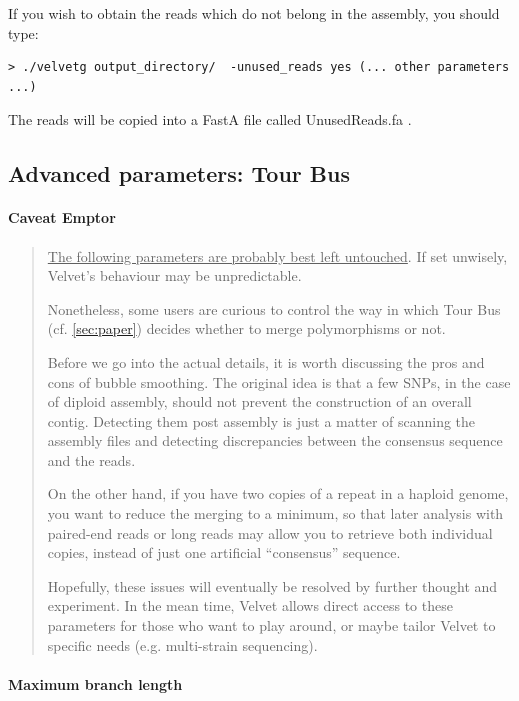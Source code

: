 \documentclass{article}
\begin{document}
	If you wish to obtain the reads which do not belong in the assembly, you should type:
	
\begin{verbatim}
> ./velvetg output_directory/  -unused_reads yes (... other parameters ...)
\end{verbatim}	

	The reads will be copied into a FastA file called UnusedReads.fa .

\subsection{Advanced parameters: Tour Bus}

\paragraph{Caveat Emptor}
\begin{quotation}
\underline{The following parameters are probably best left untouched}. If set unwisely, Velvet's behaviour may be unpredictable. 

Nonetheless, some users are curious to control the way in which Tour Bus (cf. \ref{sec:paper}) decides whether to merge polymorphisms or not.

Before we go into the actual details, it is worth discussing the pros and cons of bubble smoothing. The original idea is that a few SNPs, in the case of diploid assembly, should not prevent the construction of an overall contig. Detecting them post assembly is just a matter of scanning the assembly files and detecting discrepancies between the consensus sequence and the reads.  

On the other hand, if you have two copies of a repeat in a haploid genome, you want to reduce the merging to a minimum, so that later analysis with paired-end reads or long reads may allow you to retrieve both individual copies, instead of just one artificial ``consensus'' sequence.

Hopefully, these issues will eventually be resolved by further thought and experiment. In the mean time, Velvet allows direct access to these parameters for those who want to play around, or maybe tailor Velvet to specific needs (e.g. multi-strain sequencing). 
\end{quotation}

\paragraph{Maximum branch length}
\end{document}
